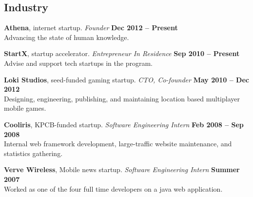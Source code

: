 \documentclass[margin,line]{resume}
\begin{document}
\begin{resume}





    \section{\mysidestyle Industry}

    \textbf{Athena}, internet startup.
        \textsl{Founder}
        \hfill \textbf{Dec 2012 -- Present}\\
    Advancing the state of human knowledge.

    \textbf{StartX}, startup accelerator.
        \textsl{Entrepreneur In Residence}
        \hfill \textbf{Sep 2010 -- Present}\\
    Advise and support tech startups in the program.

    \textbf{Loki Studios}, seed-funded gaming startup.
        \textsl{CTO, Co-founder}
        \hfill \textbf{May 2010 -- Dec 2012}\\
    Designing, engineering, publishing, and maintaining location based
    multiplayer mobile games.

    \textbf{Cooliris}, KPCB-funded startup.
          \textsl{Software Engineering Intern}
          \hfill \textbf{Feb 2008 -- Sep 2008}\\
    Internal web framework development, large-traffic website maintenance,
    and statistics gathering.

    \textbf{Verve Wireless}, Mobile news startup.
      \textsl{Software Engineering Intern}
      \hfill \textbf{Summer 2007}\\
    Worked as one of the four full time developers on a java web application.


\end{resume}
\end{document}
